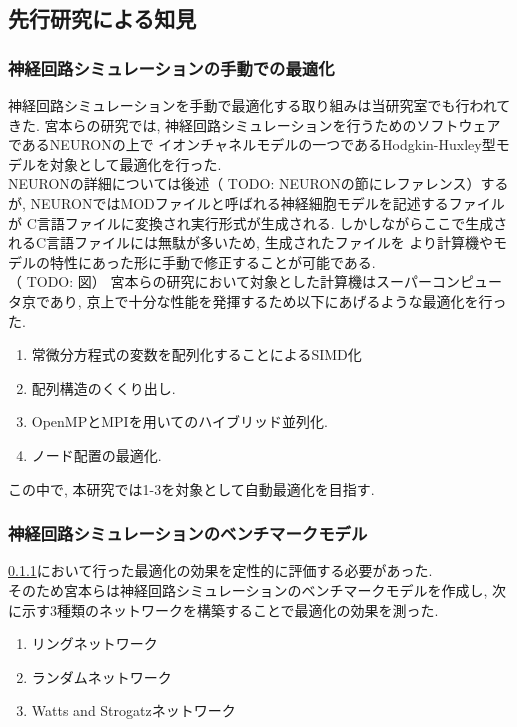 \subsection{先行研究による知見}
\subsubsection{神経回路シミュレーションの手動での最適化}
\label{sec:section1-1-1}
神経回路シミュレーションを手動で最適化する取り組みは当研究室でも行われてきた.
宮本らの研究\cite{miyamoto-master}では, 神経回路シミュレーションを行うためのソフトウェアであるNEURONの上で
イオンチャネルモデルの一つであるHodgkin-Huxley型モデルを対象として最適化を行った.\\
NEURONの詳細については後述（ TODO: NEURONの節にレファレンス）するが, NEURONではMODファイルと呼ばれる神経細胞モデルを記述するファイルが
C言語ファイルに変換され実行形式が生成される. しかしながらここで生成されるC言語ファイルには無駄が多いため, 生成されたファイルを
より計算機やモデルの特性にあった形に手動で修正することが可能である.\\
（ TODO: 図）
宮本らの研究において対象とした計算機はスーパーコンピュータ京であり, 京上で十分な性能を発揮するため以下にあげるような最適化を行った.\\

\begin{enumerate}
\item 常微分方程式の変数を配列化することによるSIMD化
\item 配列構造のくくり出し.
\item OpenMPとMPIを用いてのハイブリッド並列化.
\item ノード配置の最適化.
\end{enumerate}
この中で, 本研究では1-3を対象として自動最適化を目指す.\\


\subsubsection{神経回路シミュレーションのベンチマークモデル}
\ref{sec:section1-1-1}において行った最適化の効果を定性的に評価する必要があった.\\
そのため宮本らは神経回路シミュレーションのベンチマークモデルを作成し,
次に示す3種類のネットワークを構築することで最適化の効果を測った.\\
\begin{enumerate}
\item リングネットワーク
\item ランダムネットワーク
\item Watts and Strogatzネットワーク
\end{enumerate}

